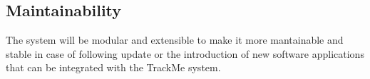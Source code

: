 \subsection{Maintainability}
The system will be modular and extensible to make it more mantainable and stable in case of following update or the introduction of new software applications that can be integrated with the TrackMe system.